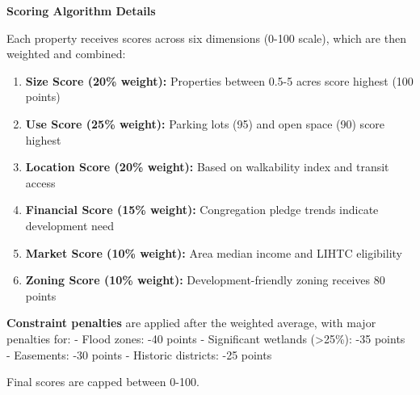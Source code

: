 \documentclass[
  letterpaper,
  DIV=11,
  numbers=noendperiod,
  oneside]{scrreprt}
\providecommand{\tightlist}{%
  \setlength{\itemsep}{0pt}\setlength{\parskip}{0pt}}
\begin{document}
\begin{tcolorbox}[enhanced jigsaw, bottomtitle=1mm, left=2mm, rightrule=.15mm, colbacktitle=quarto-callout-note-color!10!white, arc=.35mm, title=\textcolor{quarto-callout-note-color}{\faInfo}\hspace{0.5em}{Technical Methodology}, bottomrule=.15mm, colback=white, colframe=quarto-callout-note-color-frame, leftrule=.75mm, titlerule=0mm, opacitybacktitle=0.6, breakable, coltitle=black, toptitle=1mm, toprule=.15mm, opacityback=0]

\textbf{Scoring Algorithm Details}

Each property receives scores across six dimensions (0-100 scale), which
are then weighted and combined:

\begin{enumerate}
\def\labelenumi{\arabic{enumi}.}
\tightlist
\item
  \textbf{Size Score (20\% weight):} Properties between 0.5-5 acres
  score highest (100 points)
\item
  \textbf{Use Score (25\% weight):} Parking lots (95) and open space
  (90) score highest
\item
  \textbf{Location Score (20\% weight):} Based on walkability index and
  transit access
\item
  \textbf{Financial Score (15\% weight):} Congregation pledge trends
  indicate development need
\item
  \textbf{Market Score (10\% weight):} Area median income and LIHTC
  eligibility
\item
  \textbf{Zoning Score (10\% weight):} Development-friendly zoning
  receives 80 points
\end{enumerate}

\textbf{Constraint penalties} are applied after the weighted average,
with major penalties for: - Flood zones: -40 points - Significant
wetlands (\textgreater25\%): -35 points\\
- Easements: -30 points - Historic districts: -25 points

Final scores are capped between 0-100.

\end{tcolorbox}
\end{document}
